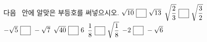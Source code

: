 다음 \blank\ 안에 알맞은 부등호를 써넣으시오.
 $\sqrt{10}\ \blank\ \sqrt{13}$
 $\sqrt{\dfrac{2}{3}}\ \blank\ \sqrt{\dfrac{3}{2}}$
 $-\sqrt{5}\ \blank\ -\sqrt{7}$
 $\sqrt{40}\ \blank\ 6$
 $\dfrac{1}{8}\ \blank\ \sqrt{\dfrac{1}{8}}$
 $-2\ \blank\ -\sqrt{6}$
